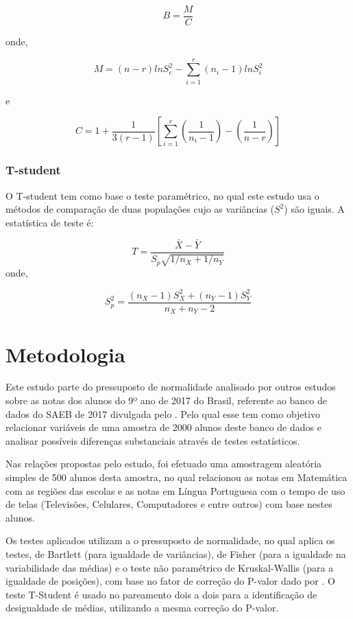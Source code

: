 $$B = \frac{M}{C}$$

onde,

$$M = (n-r)lnS^2_e - \sum_{i=1}^{r} (n_i - 1)lnS_i^2$$  

e

$$C = 1+ \frac{1}{3(r-1)}\left[\sum_{i=1}^{r} \left( \frac{1}{n_i-1}\right) - \left(\frac{1}{n-r} \right) \right]$$




\subsection{T-student}

O T-student \cite{o1908student} tem como base o teste paramétrico, no qual este estudo usa o métodos de comparação de duas populações cujo as variâncias ($S^2$) são iguais. A estatística de teste é:

$$T = \frac{\bar{X}-\bar{Y}}{S_p\sqrt{1/n_X + 1/n_Y}}$$
onde,

$$S_p^2 = \frac{(n_X-1)S_X^2 + (n_Y-1)S_Y^2}{n_X + n_Y -2}$$





\chapter{Metodologia}

Este estudo parte do pressuposto de normalidade analisado por outros estudos sobre as notas dos alunos do 9º ano de 2017 do Brasil, referente ao banco de dados do SAEB de 2017 divulgada pelo . Pelo qual esse tem como objetivo relacionar variáveis de uma amostra de 2000 alunos deste banco de dados e analisar possíveis diferenças substanciais através de testes estatísticos.

Nas relações propostas pelo estudo, foi efetuado uma amostragem aleatória simples de 500 alunos desta amostra, no qual relacionou as notas em Matemática com as regiões das escolas e as notas em Língua Portuguesa com o tempo de uso de telas (Televisões, Celulares, Computadores e entre outros) com base nestes alunos.

Os testes aplicados utilizam a o pressuposto de normalidade, no qual aplica os testes, de Bartlett (para igualdade de variâncias), de Fisher (para a igualdade na variabilidade das médias) e o teste não paramétrico de Kruskal-Wallis (para a igualdade de posições), com base no fator de correção do P-valor dado por . O teste T-Student é usado no pareamento dois a dois para a identificação de desigualdade de médias, utilizando a mesma correção do P-valor.

